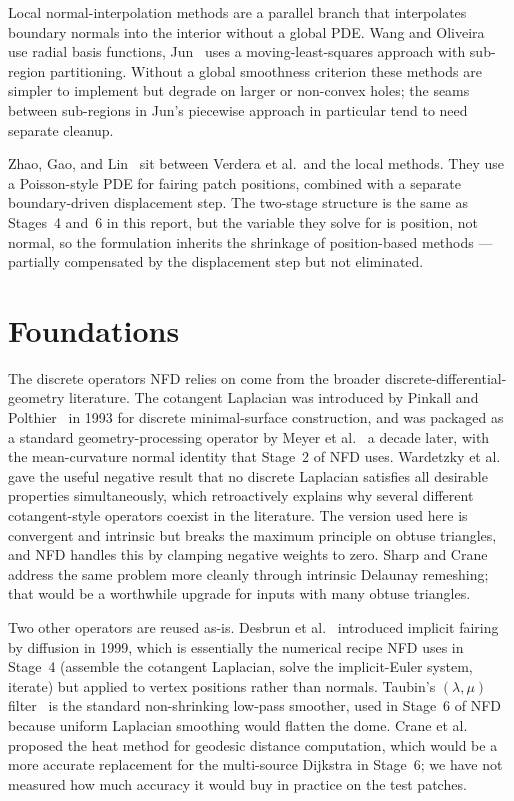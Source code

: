 Local normal-interpolation methods are a parallel branch that interpolates boundary normals into the interior without a global PDE. Wang and Oliveira~\cite{wang2007} use radial basis functions, Jun~\cite{jun2005} uses a moving-least-squares approach with sub-region partitioning. Without a global smoothness criterion these methods are simpler to implement but degrade on larger or non-convex holes; the seams between sub-regions in Jun's piecewise approach in particular tend to need separate cleanup.

Zhao, Gao, and Lin~\cite{zhao2007} sit between Verdera et al.\ and the local methods. They use a Poisson-style PDE for fairing patch positions, combined with a separate boundary-driven displacement step. The two-stage structure is the same as Stages~4 and~6 in this report, but the variable they solve for is position, not normal, so the formulation inherits the shrinkage of position-based methods --- partially compensated by the displacement step but not eliminated.

\section{Foundations}

The discrete operators NFD relies on come from the broader discrete-differential-geometry literature. The cotangent Laplacian was introduced by Pinkall and Polthier~\cite{pinkall1993} in 1993 for discrete minimal-surface construction, and was packaged as a standard geometry-processing operator by Meyer et al.~\cite{meyer2003} a decade later, with the mean-curvature normal identity that Stage~2 of NFD uses. Wardetzky et al.~\cite{wardetzky2007discrete} gave the useful negative result that no discrete Laplacian satisfies all desirable properties simultaneously, which retroactively explains why several different cotangent-style operators coexist in the literature. The version used here is convergent and intrinsic but breaks the maximum principle on obtuse triangles, and NFD handles this by clamping negative weights to zero. Sharp and Crane~\cite{sharp2020} address the same problem more cleanly through intrinsic Delaunay remeshing; that would be a worthwhile upgrade for inputs with many obtuse triangles.

Two other operators are reused as-is. Desbrun et al.~\cite{desbrun1999} introduced implicit fairing by diffusion in 1999, which is essentially the numerical recipe NFD uses in Stage~4 (assemble the cotangent Laplacian, solve the implicit-Euler system, iterate) but applied to vertex positions rather than normals. Taubin's $(\lambda, \mu)$ filter~\cite{taubin1995} is the standard non-shrinking low-pass smoother, used in Stage~6 of NFD because uniform Laplacian smoothing would flatten the dome. Crane et al.~\cite{crane2013heat} proposed the heat method for geodesic distance computation, which would be a more accurate replacement for the multi-source Dijkstra in Stage~6; we have not measured how much accuracy it would buy in practice on the test patches.

